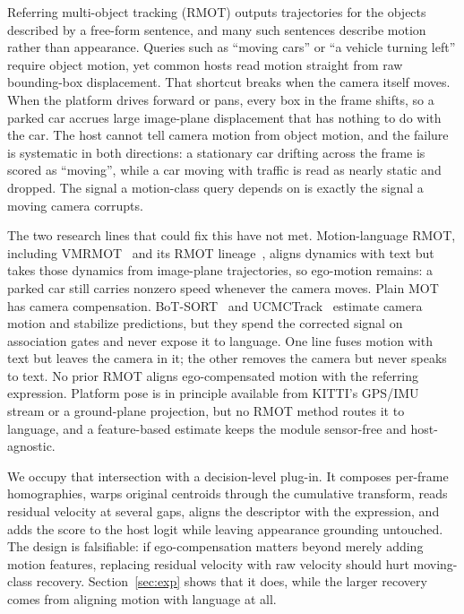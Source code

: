 \documentclass[sigconf,review,anonymous]{acmart}
\begin{document}
Referring multi-object tracking (RMOT) outputs trajectories for the objects described by a free-form sentence, and many such sentences describe motion rather than appearance. Queries such as ``moving cars'' or ``a vehicle turning left'' require object motion, yet common hosts read motion straight from raw bounding-box displacement. That shortcut breaks when the camera itself moves. When the platform drives forward or pans, every box in the frame shifts, so a parked car accrues large image-plane displacement that has nothing to do with the car. The host cannot tell camera motion from object motion, and the failure is systematic in both directions: a stationary car drifting across the frame is scored as ``moving'', while a car moving with traffic is read as nearly static and dropped. The signal a motion-class query depends on is exactly the signal a moving camera corrupts.

The two research lines that could fix this have not met. Motion-language RMOT, including VMRMOT~\cite{vmrmot} and its RMOT lineage~\cite{transrmot,ikun,flexhook}, aligns dynamics with text but takes those dynamics from image-plane trajectories, so ego-motion remains: a parked car still carries nonzero speed whenever the camera moves. Plain MOT has camera compensation. BoT-SORT~\cite{botsort} and UCMCTrack~\cite{ucmctrack} estimate camera motion and stabilize predictions, but they spend the corrected signal on association gates and never expose it to language. One line fuses motion with text but leaves the camera in it; the other removes the camera but never speaks to text. No prior RMOT aligns ego-compensated motion with the referring expression. Platform pose is in principle available from KITTI's GPS/IMU stream or a ground-plane projection, but no RMOT method routes it to language, and a feature-based estimate keeps the module sensor-free and host-agnostic.

We occupy that intersection with a decision-level plug-in. It composes per-frame homographies, warps original centroids through the cumulative transform, reads residual velocity at several gaps, aligns the descriptor with the expression, and adds the score to the host logit while leaving appearance grounding untouched. The design is falsifiable: if ego-compensation matters beyond merely adding motion features, replacing residual velocity with raw velocity should hurt moving-class recovery. Section~\ref{sec:exp} shows that it does, while the larger recovery comes from aligning motion with language at all.
\end{document}

